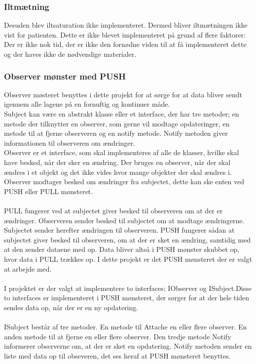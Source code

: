 \subsubsection{Iltmætning}
Desuden blev iltsaturation ikke implementeret. Dermed bliver iltmætningen ikke vist for patienten. Dette er ikke blevet implementeret på grund af flere faktorer: Der er ikke nok tid, der er ikke den fornødne viden til at få implementeret dette og der haves ikke de nødvendige materialer.
\subsubsection{Observer mønster med PUSH}
Observer møsteret benyttes i dette projekt for at sørge for at data bliver sendt igennem alle lagene på en fornuftig og kontinuer måde.\\
Subject kan være en abstrakt klasse eller et interface, der har tre metoder; en metode der tilknytter en observer, som gerne vil modtage opdateringer, en metode til at fjerne observeren og en notify metode. Notify metoden giver informationen til observeren om ændringer.\\
Observer er et interface, som skal implementeres af alle de klasser, hvilke skal have besked, når der sker en ændring. Der bruges en observer, når der skal ændres i et objekt og det ikke vides hvor mange objekter der skal ændres i. Observer modtager besked om ændringer fra subjectet, dette kan ske enten ved PUSH eller PULL mønsteret. \\\\
PULL fungerer ved at subjectet giver besked til observeren om at der er ændringer. Observeren sender besked til subjectet om at modtage ændringerne. Subjectet sender herefter ændringen til observeren.
PUSH fungerer sådan at subjectet giver besked til observeren, om at der er sket en ændring, samtidig med at den sender dataene med op. Data bliver altså i PUSH mønster skubbet op, hvor data i PULL trækkes op. I dette projekt er det PUSH mønsteret der er valgt at arbejde med.\\ 
\\
I projektet er der valgt at implementere to interfaces; IObserver og ISubject.Disse to interfaces er implementeret i PUSH mønsteret, der sørger for at der hele tiden sendes data op, når der er en ny opdatering. \\
\\
ISubject består af tre metoder. En metode til Attache en eller flere observer. En anden metode til at fjerne en eller flere observer. Den tredje metode Notify informerer observerne om, at der er sket en opdatering. Notify metoden sender en liste med data op til obseveren, det ses heraf at PUSH mønsteret benyttes.\\
